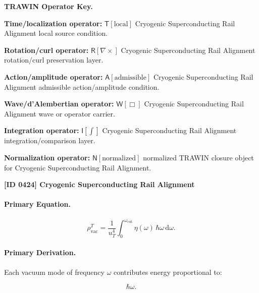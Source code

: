 \par\vspace{0.45\baselineskip}
\noindent\begin{minipage}[t]{\linewidth}
\begingroup
\small
\raggedright
\textbf{TRAWIN Operator Key.}\par
\noindent\textbf{Time/localization operator:} $\mathsf{T}\!\left[\mathrm{local}\right]$ Cryogenic Superconducting Rail Alignment local source condition.\par
\noindent\textbf{Rotation/curl operator:} $\mathsf{R}\!\left[\nabla\times\right]$ Cryogenic Superconducting Rail Alignment rotation/curl preservation layer.\par
\noindent\textbf{Action/amplitude operator:} $\mathsf{A}\!\left[\mathrm{admissible}\right]$ Cryogenic Superconducting Rail Alignment admissible action/amplitude condition.\par
\noindent\textbf{Wave/d'Alembertian operator:} $\mathsf{W}\!\left[\Box\right]$ Cryogenic Superconducting Rail Alignment wave or operator carrier.\par
\noindent\textbf{Integration operator:} $\mathsf{I}\!\left[\int\right]$ Cryogenic Superconducting Rail Alignment integration/comparison layer.\par
\noindent\textbf{Normalization operator:} $\mathsf{N}\!\left[\mathrm{normalized}\right]$ normalized TRAWIN closure object for Cryogenic Superconducting Rail Alignment.\par
\endgroup
\end{minipage}

\clearpage
\noindent\textbf{[ID 0424] Cryogenic Superconducting Rail Alignment}\par
\vspace{0.35em}
\paragraph{Primary Equation.}
\begin{equation}
\rho_{\mathrm{vac}}^{T}
=
\frac{1}{u_T^4}
\int_{0}^{\omega_{\mathrm{cut}}}
\eta(\omega)\,
\hbar\omega\,
\mathrm{d}\omega .
\end{equation}

\paragraph{Primary Derivation.}
Each vacuum mode of frequency $\omega$ contributes energy proportional to:

\begin{equation}
\hbar\omega .
\end{equation}

